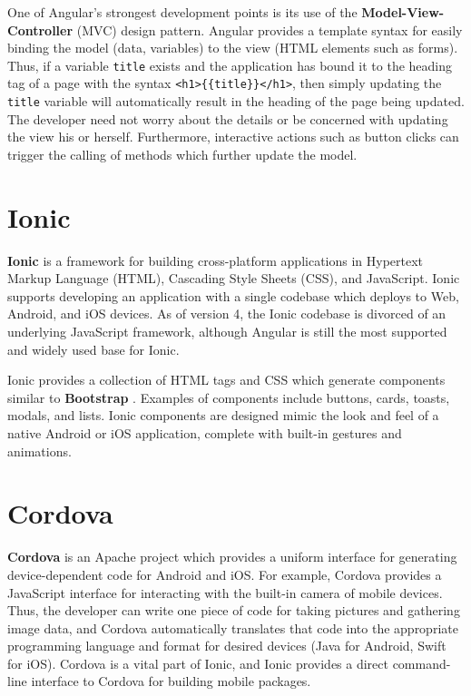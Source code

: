 \documentclass[12pt]{report}
\begin{document}
One of Angular's strongest development points is its use of the
\textbf{Model-View-Controller} (MVC) design pattern. Angular provides a template
syntax for easily binding the model (data, variables) to the view (HTML elements
such as forms). Thus, if a variable \texttt{title} exists and the application
has bound it to the heading tag of a page with the syntax
\texttt{<h1>\{\{title\}\}</h1>}, then simply updating the \texttt{title}
variable will automatically result in the heading of the page being updated. The
developer need not worry about the details or be concerned with updating the
view his or herself. Furthermore, interactive actions such as button clicks can
trigger the calling of methods which further update the model.
    
    \section{Ionic}

\textbf{Ionic} \cite{ionic} is a framework for building cross-platform
applications in Hypertext Markup Language (HTML), Cascading Style Sheets (CSS),
and JavaScript. Ionic supports developing an application with a single codebase
which deploys to Web, Android, and iOS devices. As of version 4, the Ionic
codebase is divorced of an underlying JavaScript framework, although Angular is
still the most supported and widely used base for Ionic.

Ionic provides a collection of HTML tags and CSS which generate components
similar to \textbf{Bootstrap} \cite{bootstrap}. Examples of components include
buttons, cards, toasts, modals, and lists. Ionic components are designed mimic
the look and feel of a native Android or iOS application, complete with built-in
gestures and animations.
    
    \section{Cordova}

\textbf{Cordova} \cite{cordova} is an Apache project which provides a uniform
interface for generating device-dependent code for Android and iOS. For example,
Cordova provides a JavaScript interface for interacting with the built-in camera
of mobile devices. Thus, the developer can write one piece of code for taking
pictures and gathering image data, and Cordova automatically translates that
code into the appropriate programming language and format for desired devices
(Java for Android, Swift for iOS). Cordova is a vital part of Ionic, and Ionic
provides a direct command-line interface to Cordova for building mobile
packages.
    
\end{document}
